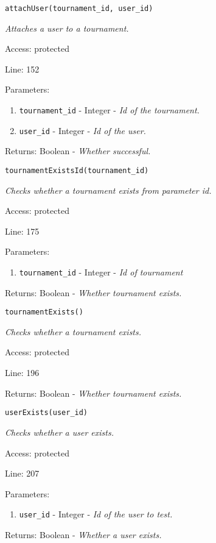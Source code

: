 \texttt{attachUser(tournament\_id, user\_id)}

{\scriptsize
\textit{Attaches a user to a tournament.}

Access: protected

Line: 152

Parameters:

\begin{enumerate}
\item \texttt{tournament\_id} - Integer - \textit{Id of the tournament.}
\item \texttt{user\_id} - Integer - \textit{Id of the user.}
\end{enumerate}
Returns: Boolean - \textit{Whether successful.}

}

\texttt{tournamentExistsId(tournament\_id)}

{\scriptsize
\textit{Checks whether a tournament exists from parameter id.}

Access: protected

Line: 175

Parameters:

\begin{enumerate}
\item \texttt{tournament\_id} - Integer - \textit{Id of tournament}
\end{enumerate}
Returns: Boolean - \textit{Whether tournament exists.}

}

\texttt{tournamentExists()}

{\scriptsize
\textit{Checks whether a tournament exists.}

Access: protected

Line: 196

Returns: Boolean - \textit{Whether tournament exists.}

}

\texttt{userExists(user\_id)}

{\scriptsize
\textit{Checks whether a user exists.}

Access: protected

Line: 207

Parameters:

\begin{enumerate}
\item \texttt{user\_id} - Integer - \textit{Id of the user to test.}
\end{enumerate}
Returns: Boolean - \textit{Whether a user exists.}

}

